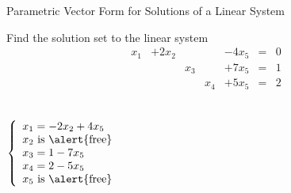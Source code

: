 \documentclass[xcolor=dvipsnames,aspectratio=169,t]{beamer}
\begin{document}
\begin{frame}{Parametric Vector Form for Solutions of a Linear System}

  Find the solution set to the linear system
  \[
    \begin{array}{ccccccc}
      x_1 & +2x_2 &     &     & -4x_5 &=& 0\\
          &       & x_3 &     & +7x_5 &=& 1 \\   
          &       &     & x_4 & +5x_5 &=& 2
    \end{array}
  \]

  {\small
  \begin{columns}
  \pause
  \[
    \left\{ \begin{array}{l}
    x_1 = -2x_2 +4x_5\\
    x_2 \text{ is \alert{free}}\\
    x_3 = 1-7x_5 \\
    x_4 = 2-5x_5 \\
    x_5 \text{ is \alert{free}}\\
    \end{array} \right.
  \]
  

\end{columns}}
\end{frame}
\end{document}
